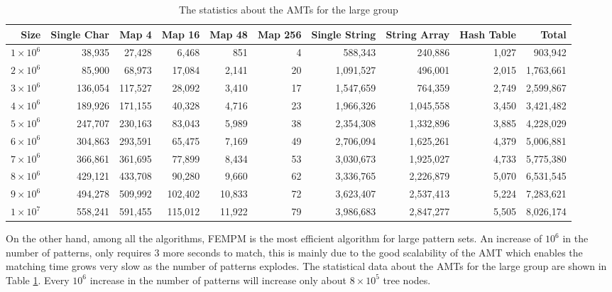 \begin{table}[!htp]
  \caption{The statistics about the AMTs for the large group}
  \scriptsize
  \label{tab:large_group}
  \begin{tabular}{rrrrrrrrrr}
 \hline
 Size &
 Single Char &
 Map 4 &
 Map 16 &
 Map 48 &
 Map 256 &
 Single String &
 String Array   &
 Hash Table &
 Total\\
\hline
$1 \times 10^6$ &  38,935 &   27,428  &   6,468 &     851   &    4 &    588,343  &    240,886 &  1,027 &    903,942  \\
$2 \times 10^6$ &  85,900 &   68,973  &  17,084 &   2,141   &   20 &  1,091,527  &    496,001 &  2,015 &  1,763,661  \\
$3 \times 10^6$ & 136,054 &  117,527  &  28,092 &   3,410   &   17 &  1,547,659  &    764,359 &  2,749 &  2,599,867  \\
$4 \times 10^6$ & 189,926 &  171,155  &  40,328 &   4,716   &   23 &  1,966,326  &  1,045,558 &  3,450 &  3,421,482  \\
$5 \times 10^6$ & 247,707 &  230,163  &  83,043 &   5,989   &  38 &  2,354,308   &  1,332,896 &  3,885 &  4,228,029  \\
$6 \times 10^6$ & 304,863 &  293,591  &  65,475 &   7,169   &   49 &  2,706,094  &  1,625,261 &  4,379 &  5,006,881  \\
$7 \times 10^6$ & 366,861 &  361,695  &  77,899 &   8,434   &   53 &  3,030,673  &  1,925,027 &  4,733 &  5,775,380  \\
$8 \times 10^6$ & 429,121 &  433,708  &  90,280 &   9,660   &   62 &  3,336,765  &  2,226,879 &  5,070 &  6,531,545  \\
$9 \times 10^6$ & 494,278 &  509,992  & 102,402 &  10,833   &   72 &  3,623,407  &  2,537,413 &  5,224 &  7,283,621  \\
$1 \times 10^7$ & 558,241 &  591,455  & 115,012 &  11,922   &   79 &  3,986,683  &  2,847,277 &  5,505 &  8,026,174  \\
\hline
\end{tabular}
\end{table}

On the other hand, among all the algorithms, \textsf{FEMPM} is the
most efficient algorithm for large pattern sets. An increase of $10^6$
in the number of patterns, only requires 3 more seconds to match, this
is mainly due to the good scalability of the AMT which enables the
matching time grows very slow as the number of patterns explodes. The
statistical data about the AMTs for the large group are shown in Table
\ref{tab:large_group}. Every $10^6$ increase in the number of patterns
will increase only about $8 \times 10^5$ tree nodes.

